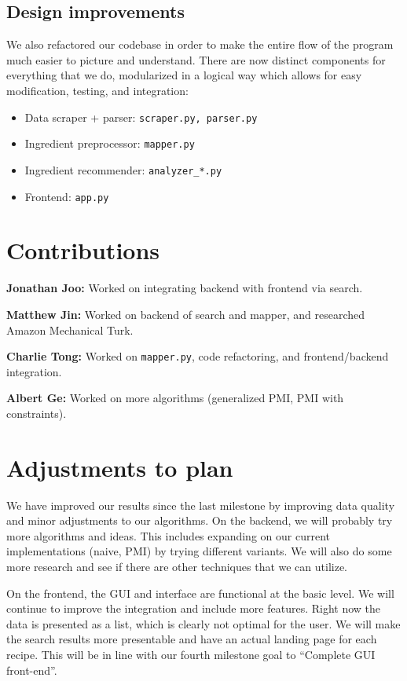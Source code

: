 \documentclass{article}
\begin{document}
\subsection{Design improvements}
We also refactored our codebase in order to make the entire flow of the program much easier to picture and understand. There are now distinct components for everything that we do, modularized in a logical way which allows for easy modification, testing, and integration:
\begin{itemize}
  \item Data scraper + parser: \texttt{scraper.py, parser.py}
  \item Ingredient preprocessor: \texttt{mapper.py}
  \item Ingredient recommender: \texttt{analyzer\_*.py}
  \item Frontend: \texttt{app.py}
\end{itemize}



\section{Contributions}
\textbf{Jonathan Joo:} Worked on integrating backend with frontend via search.

\textbf{Matthew Jin:} Worked on backend of search and mapper, and researched Amazon Mechanical Turk.

\textbf{Charlie Tong:} Worked on \texttt{mapper.py}, code refactoring, and frontend/backend integration.

\textbf{Albert Ge:} Worked on more algorithms (generalized PMI, PMI with constraints).



\section{Adjustments to plan}

We have improved our results since the last milestone by improving data quality and minor adjustments to our algorithms. On the backend, we will probably try more algorithms and ideas. This includes expanding on our current implementations (naive, PMI) by trying different variants. We will also do some more research and see if there are other techniques that we can utilize.

On the frontend, the GUI and interface are functional at the basic level. We will continue to improve the integration and include more features. Right now the data is presented as a list, which is clearly not optimal for the user. We will make the search results more presentable and have an actual landing page for each recipe. This will be in line with our fourth milestone goal to ``Complete GUI front-end''.
\end{document}
